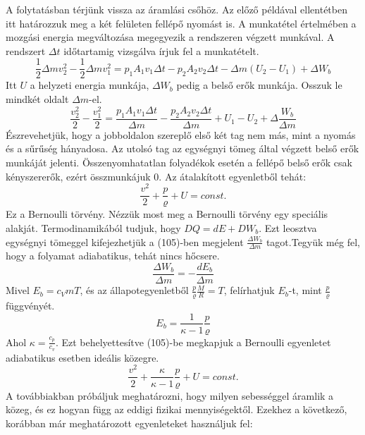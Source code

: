\documentclass[a4paper,12pt]{article}
\begin{document}
A folytatásban térjünk vissza az áramlási csőhöz. Az előző példával ellentétben itt határozzuk meg a két felületen fellépő nyomást is. A munkatétel értelmében a mozgási energia megváltozása megegyezik a rendszeren végzett munkával. A rendszert $\Delta t$ időtartamig vizsgálva írjuk fel a munkatételt.
\begin{equation}
\frac{1}{2}\Delta mv_2^2-\frac{1}{2}\Delta mv_1^2=p_1A_1v_1\Delta t-p_2A_2v_2\Delta t-\Delta m(U_2-U_1)+\Delta W_b
\end{equation}
Itt $U$ a helyzeti energia munkája, $\Delta W_b$ pedig a belső erők munkája. Osszuk le mindkét oldalt $\Delta m$-el.
\begin{equation}
\frac{v_2^2}{2}-\frac{v_1^2}{2}=\frac{p_1A_1v_1\Delta t}{\Delta m}-\frac{p_2A_2v_2\Delta t}{\Delta m}+U_1-U_2+\Delta\frac{W_b}{\Delta m}
\end{equation}
Észrevehetjük, hogy a jobboldalon szereplő első két tag nem más, mint a nyomás és a sűrűség hányadosa. Az utolsó tag az egységnyi tömeg által végzett belső erők munkáját jelenti. Összenyomhatatlan folyadékok esetén a fellépő belső erők csak kényszererők, ezért összmunkájuk 0. Az átalakított egyenletből tehát:
\begin{equation}
\frac{v^2}{2}+\frac{p}{\varrho}+U=const.
\end{equation}
Ez a Bernoulli törvény.
Nézzük most meg a Bernoulli törvény egy speciális alakját. Termodinamikából tudjuk, hogy $DQ=dE+DW_b$. Ezt leosztva egységnyi tömeggel kifejezhetjük a (105)-ben megjelent $\frac{\Delta W_b}{\Delta m}$ tagot.Tegyük még fel, hogy a folyamat adiabatikus, tehát nincs hőcsere.
\begin{equation}
\frac{\Delta W_b}{\Delta m}=-\frac{dE_b}{\Delta m}
\end{equation}
Mivel $E_b=c_VmT$, és az állapotegyenletből $\frac{p}{\varrho}\frac{M}{R}=T$, felírhatjuk $E_b$-t, mint $\frac{p}{\varrho}$ függvényét.
\begin{equation}
E_b=\frac{1}{\kappa-1}\frac{p}{\varrho}
\end{equation}
Ahol $\kappa=\frac{c_p}{c_v}$. Ezt behelyettesítve (105)-be megkapjuk a Bernoulli egyenletet adiabatikus esetben ideális közegre.
\begin{equation}
\frac{v^2}{2}+\frac{\kappa}{\kappa-1}\frac{p}{\varrho}+U=const.
\end{equation}
A továbbiakban próbáljuk meghatározni, hogy milyen sebességgel áramlik a közeg, és ez hogyan függ az eddigi fizikai mennyiségektől. Ezekhez a következő, korábban már meghatározott egyenleteket használjuk fel:
\end{document}
